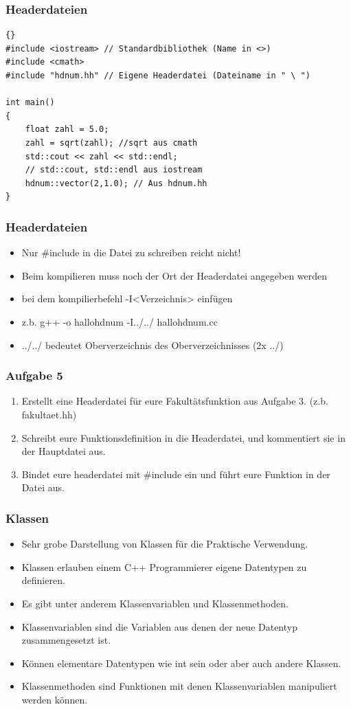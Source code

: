 \documentclass[ignorenonframetext,12pt]{beamer}
\theoremstyle{definition}
\theoremstyle{definition}
\begin{document}
\begin{frame}[fragile]
\frametitle{Headerdateien}
{\scriptsize\begin{lstlisting}{}
#include <iostream> // Standardbibliothek (Name in <>)
#include <cmath>
#include "hdnum.hh" // Eigene Headerdatei (Dateiname in " \ ")

int main()
{
	float zahl = 5.0;
	zahl = sqrt(zahl); //sqrt aus cmath 
	std::cout << zahl << std::endl; 
	// std::cout, std::endl aus iostream
	hdnum::vector(2,1.0); // Aus hdnum.hh
}
\end{lstlisting}}
\end{frame}

\begin{frame}[fragile]
\frametitle{Headerdateien}
\begin{itemize}
\item Nur \#include in die Datei zu schreiben reicht nicht!
\item Beim kompilieren muss noch der Ort der Headerdatei angegeben werden
\item bei dem kompilierbefehl -I<Verzeichnis> einfügen
\item z.b. g++ -o hallohdnum -I../../ hallohdnum.cc
\item ../../ bedeutet Oberverzeichnis des Oberverzeichnisses (2x ../)

\end{itemize}
\end{frame}


\begin{frame}[fragile]
\frametitle{Aufgabe 5}
\begin{enumerate}
\item Erstellt eine Headerdatei für eure Fakultätsfunktion aus Aufgabe 3. (z.b. fakultaet.hh)
\item Schreibt eure Funktionsdefinition in die Headerdatei, und kommentiert sie in der Hauptdatei aus.
\item Bindet eure headerdatei mit \#include ein und führt eure Funktion in der Datei aus.
\end{enumerate}
\end{frame}

\begin{frame}[fragile]
\frametitle{Klassen}
\begin{itemize}
\item Sehr grobe Darstellung von Klassen für die Praktische Verwendung.
\item Klassen erlauben einem C++ Programmierer eigene Datentypen zu definieren.
\item Es gibt unter anderem Klassenvariablen und Klassenmethoden.
\item Klassenvariablen sind die Variablen aus denen der neue Datentyp zusammengesetzt ist.
\item Können elementare Datentypen wie int sein oder aber auch andere Klassen.
\item Klassenmethoden sind Funktionen mit denen Klassenvariablen manipuliert werden können.
\end{itemize}
\end{frame}
\end{document}
